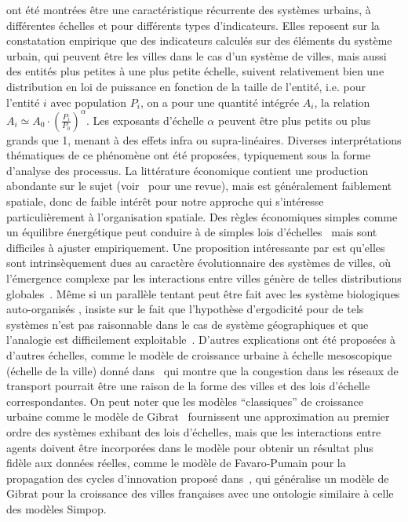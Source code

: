 { ont été montrées être une caractéristique récurrente des systèmes urbains, à différentes échelles et pour différents types d'indicateurs. Elles reposent sur la constatation empirique que des indicateurs calculés sur des éléments du système urbain, qui peuvent être les villes dans le cas d'un système de villes, mais aussi des entités plus petites à une plus petite échelle, suivent relativement bien une distribution en loi de puissance en fonction de la taille de l'entité, i.e. pour l'entité $i$ avec population $P_i$, on a pour une quantité intégrée $A_i$, la relation $A_i \simeq A_0\cdot \left(\frac{P_i}{P_0}\right)^{\alpha}$. Les exposants d'échelle $\alpha$ peuvent être plus petits ou plus grands que 1, menant à des effets infra ou supra-linéaires. Diverses interprétations thématiques de ce phénomène ont été proposées, typiquement sous la forme d'analyse des processus. La littérature économique contient une production abondante sur le sujet (voir~\cite{Gabaix20042341} pour une revue), mais est généralement faiblement spatiale, donc de faible intérêt pour notre approche qui s'intéresse particulièrement à l'organisation spatiale. Des règles économiques simples comme un équilibre énergétique peut conduire à de simples lois d'échelles~\cite{bettencourt2008large} mais sont difficiles à ajuster empiriquement. Une proposition intéressante par  est qu'elles sont intrinsèquement dues au caractère évolutionnaire des systèmes de villes, où l'émergence complexe par les interactions entre villes génère de telles distributions globales~\cite{pumain2006evolutionary}. Même si un parallèle tentant peut être fait avec les système biologiques auto-organisés %
 ,  insiste sur le fait que l'hypothèse d'ergodicité 
  pour de tels systèmes n'est pas raisonnable dans le cas de système géographiques et que l'analogie est difficilement exploitable~\cite{pumain2012urban}. D'autres explications ont été proposées à d'autres échelles, comme le modèle de croissance urbaine à échelle mesoscopique (échelle de la ville) donné dans~\cite{2014arXiv1401.8200L} qui montre que la congestion dans les réseaux de transport pourrait être une raison de la forme des villes et des lois d'échelle correspondantes. On peut noter que les modèles ``classiques'' de croissance urbaine comme le modèle de Gibrat~\cite{favaro2011gibrat} fournissent une approximation au premier ordre des systèmes %
  exhibant des lois d'échelles, mais que les interactions entre agents doivent être incorporées dans le modèle pour obtenir un résultat plus fidèle aux données réelles, comme le modèle de Favaro-Pumain pour la propagation des cycles d'innovation proposé dans~\cite{favaro2011gibrat}, qui généralise un modèle de Gibrat pour la croissance des villes françaises avec une ontologie similaire à celle des modèles Simpop.
}


